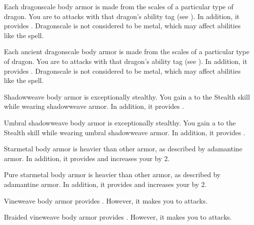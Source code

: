        Each dragonscale body armor is made from the scales of a particular type of dragon.
      You are  to attacks with that dragon's ability tag (see ).
      In addition, it provides  .
      Dragonscale is not considered to be metal, which may affect abilities like the  spell.

       Each ancient dragonscale body armor is made from the scales of a particular type of dragon.
      You are  to attacks with that dragon's ability tag (see ).
      In addition, it provides  .
      Dragonscale is not considered to be metal, which may affect abilities like the  spell.

       Shadowweave body armor is exceptionally stealthy.
      You gain a   to the Stealth skill while wearing shadowweave armor.
      In addition, it provides  .

       Umbral shadowweave body armor is exceptionally stealthy.
      You gain a   to the Stealth skill while wearing umbral shadowweave armor.
      In addition, it provides  .

       Starmetal body armor is heavier than other armor, as described by adamantine armor.
      In addition, it provides   and increases your  by 2.

       Pure starmetal body armor is heavier than other armor, as described by adamantine armor.
      In addition, it provides   and increases your  by 2.

       Vineweave body armor provides  .
      However, it makes you \vulnerable to \atFire attacks.

       Braided vineweave body armor provides  .
      However, it makes you \vulnerable to \atFire attacks.

